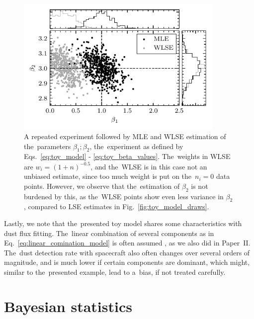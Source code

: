 \begin{figure}[ht]
 	\centering
 	\includegraphics[width=10cm]{figures/toy_model_draws_weighted.pdf}
 	\caption{A repeated experiment followed by MLE and WLSE estimation of the~parameters $\beta_1; \beta_2$, the~experiment as defined by Eqs.~\ref{eq:toy_model} - \ref{eq:toy_beta_values}. The~weights in WLSE are $w_i = (1+n)^{-0.5}$, and the~WLSE is in this case not an unbiased estimate, since too much weight is put on the~$n_i=0$ data points. However, we observe that the~estimation of $\beta_2$ is not burdened by this, as the~WLSE points show even less variance in $\beta_2$, compared to LSE estimates in Fig.~\ref{fig:toy_model_draws}.}
 	\label{fig:toy_model_draws_weighted}
\end{figure}

Lastly, we note that the~presented toy model shares some characteristics with dust flux fitting. The~linear combination of several components as in Eq.~\ref{eq:linear_comination_model} is often assumed \citep{szalay2021collisional,zaslavsky2012interplanetary}, as we also did in Paper~II. The~dust detection rate with spacecraft also often changes over several orders of magnitude, and is much lower if certain components are dominant, which might, similar to the~presented example, lead to a~bias, if not treated carefully. 

\section{Bayesian statistics}

